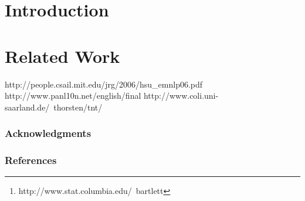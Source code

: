 \documentclass{article}
\title{}
\author{
Nicholas Bartlett\thanks{ http://www.stat.columbia.edu/~bartlett} \\
Department of Statistics\\
Columbia University\\
New York, NY 10027, USA \\
\texttt{bartlett@stat.columbia.edu} \\
\And
David Pfau \\
Neuroscience or Something \\
Columbia University\\
New York, NY 10027, USA \\
\texttt{hotmail.com@gmail.com} \\
\AND
Frank Wood \\
Department of Statistics\\
Columbia University\\
New York, NY 10027, USA \\
\texttt{fwood@stat.columbia.edu} \\
}
\begin{document}
\makeanontitle

\begin{abstract}

\end{abstract}

\section{Introduction}

\section{Related Work}

http://people.csail.mit.edu/jrg/2006/hsu\_emnlp06.pdf
http://www.panl10n.net/english/final%
http://www.coli.uni-saarland.de/~thorsten/tnt/

\subsubsection*{Acknowledgments}

\subsubsection*{References}
\begin{small}

 
%
\end{small}
\end{document}
